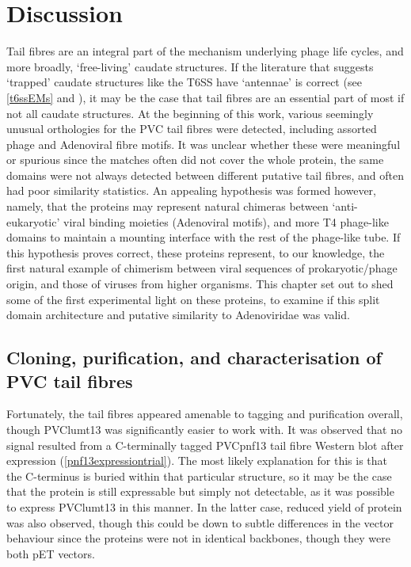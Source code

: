 \section{Discussion}
Tail fibres are an integral part of the mechanism underlying phage life cycles, and more broadly, `free-living' caudate structures. If the literature that suggests `trapped' caudate structures like the T6SS have `antennae' is correct (see \vref{t6ssEMs} and \cite{Chang2017}), it may be the case that tail fibres are an essential part of most if not all caudate structures. At the beginning of this work, various seemingly unusual orthologies for the PVC tail fibres were detected, including assorted phage and Adenoviral fibre motifs. It was unclear whether these were meaningful or spurious since the matches often did not cover the whole protein, the same domains were not always detected between different putative tail fibres, and often had poor similarity statistics. An appealing hypothesis was formed however, namely, that the proteins may represent natural chimeras between `anti-eukaryotic' viral binding moieties (Adenoviral motifs), and more T4 phage-like domains to maintain a mounting interface with the rest of the phage-like tube. If this hypothesis proves correct, these proteins represent, to our knowledge, the first natural example of chimerism between viral sequences of prokaryotic/phage origin, and those of viruses from higher organisms. This chapter set out to shed some of the first experimental light on these proteins, to examine if this split domain architecture and putative similarity to Adenoviridae was valid.

\subsection{Cloning, purification, and characterisation of PVC tail fibres}
Fortunately, the tail fibres appeared amenable to tagging and purification overall, though PVClumt13 was significantly easier to work with. It was observed that no signal resulted from a C-terminally tagged PVCpnf13 tail fibre Western blot after expression (\vref{pnf13expressiontrial}). The most likely explanation for this is that the C-terminus is buried within that particular structure, so it may be the case that the protein is still expressable but simply not detectable, as it was possible to express PVClumt13 in this manner. In the latter case, reduced yield of protein was also observed, though this could be down to subtle differences in the vector behaviour since the proteins were not in identical backbones, though they were both pET vectors.

